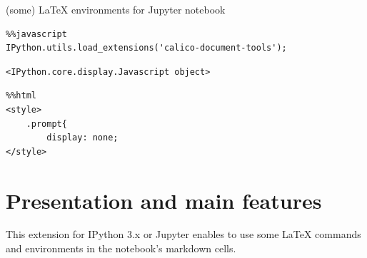 
    
    
    
    


    

    
    (some) LaTeX environments for Jupyter notebook
\begin{lstlisting}
%%javascript 
IPython.utils.load_extensions('calico-document-tools');
\end{lstlisting}%
%
    
    \begin{verbatim}
<IPython.core.display.Javascript object>
\end{verbatim}

\begin{lstlisting}
%%html
<style>
    .prompt{
        display: none;
</style>
\end{lstlisting}
    \section{Presentation and main
features}\label{presentation-and-main-features}

    This extension for IPython 3.x or Jupyter enables to use some LaTeX
commands and environments in the notebook's markdown cells.

